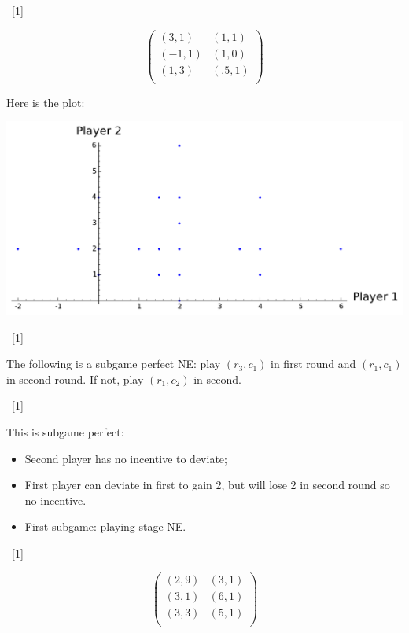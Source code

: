 \documentclass[12pt,a4paper]{article}
\begin{document}
\begin{enumerate}
\begin{enumerate}
            ~\hfill[1]

            \[
                \begin{pmatrix}
                    (3,1) & (1,1)\\
                    (-1,1) & (1,0)\\
                    (1,3) & (.5,1)\\
                \end{pmatrix}
            \]

            Here is the plot:

            \begin{center}
                \includegraphics[width=.6\textwidth]{plots/resit-sol-2013-2014-plt02.pdf}
            \end{center}

            ~\hfill[1]

            The following is a subgame perfect NE: play \((r_3, c_1)\) in first
            round and \((r_1, c_1)\) in second round. If not, play \((r_1, c_2)\) in second.

            ~\hfill[1]

            This is subgame perfect:

            \begin{itemize}
                \item Second player has no incentive to deviate;
                \item First player can deviate in first to gain 2, but will
                    lose 2 in second round so no incentive.
                \item First subgame: playing stage NE.
            \end{itemize}

            ~\hfill[1]

            \[
                \begin{pmatrix}
                    (2,9) & (3,1)\\
                    (3,1) & (6,1)\\
                    (3,3) & (5,1)\\
                \end{pmatrix}
            \]


\end{enumerate}
\end{enumerate}
\end{document}
